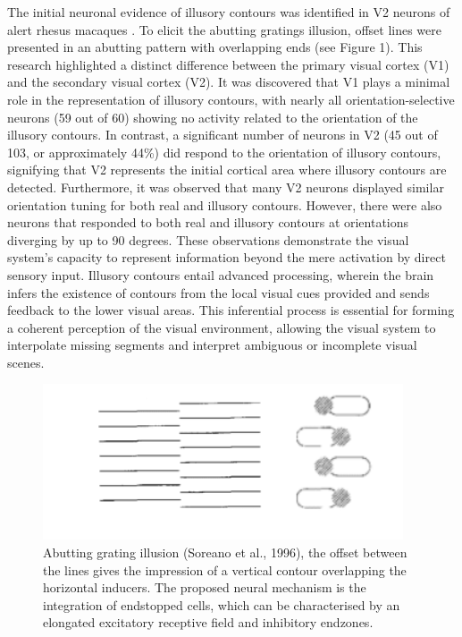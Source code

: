 \documentclass[12pt]{article}
\begin{document}
\noindent The initial neuronal evidence of illusory contours was identified in V2 neurons of alert rhesus macaques \autocite{vonderheydtMechanismsContourPerception1989}.
To elicit the abutting gratings illusion, offset lines were presented in an abutting pattern with overlapping ends (see Figure 1). This research highlighted 
a distinct difference between the primary visual  cortex (V1) and the secondary visual cortex (V2). It was discovered that V1 plays a minimal role in the representation of illusory contours, with nearly all orientation-selective neurons (59 out of 60) showing no activity related to the orientation of the illusory contours. In contrast, a significant number of neurons in V2 (45 out of 103, or approximately 44\%) did respond to the orientation of illusory contours, signifying that V2 represents the initial cortical area where illusory contours are detected. Furthermore, it was observed that many V2 neurons displayed similar orientation tuning for both real and illusory contours. However, there were also neurons that responded to both real and illusory contours at  orientations diverging by up to 90 degrees. These observations demonstrate the visual system's capacity to represent information beyond the mere activation by direct sensory input. Illusory contours entail advanced processing, wherein the brain infers the existence of contours from the local visual cues provided and sends feedback to the lower visual areas. 
This inferential process is essential for forming a coherent perception of the visual environment, allowing the visual system to interpolate missing segments and interpret ambiguous or incomplete visual scenes.
  
\begin{figure}
    \centering
    \includegraphics[width=0.95\textwidth]{figures/simple_abutting.png}
    \caption{Abutting grating illusion (Soreano et al., 1996), the offset between the lines gives the impression of a vertical contour overlapping the horizontal inducers. 
    The proposed neural mechanism is the integration of endstopped cells, which can be characterised by an elongated excitatory receptive field and inhibitory endzones.}
    \label{fig:figure_1}
\end{figure}
\end{document}
